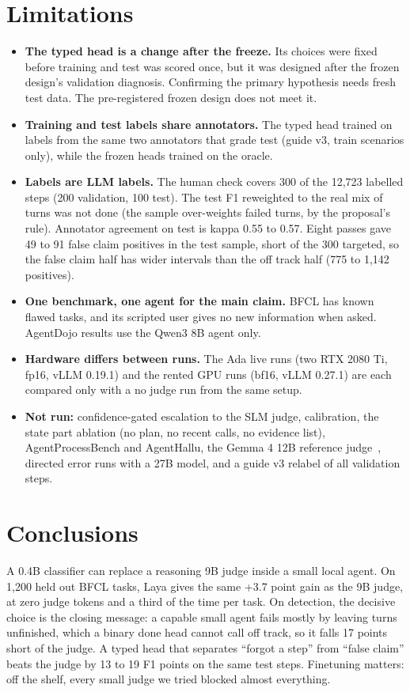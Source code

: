 \documentclass[10pt,a4paper]{article}
\begin{document}
\section{Limitations}\label{sec:limits}
\begin{itemize}
  \item \textbf{The typed head is a change after the freeze.} Its choices were fixed before training and test was scored once, but it was designed after the frozen design's validation diagnosis. Confirming the primary hypothesis needs fresh test data. The pre-registered frozen design does not meet it.
  \item \textbf{Training and test labels share annotators.} The typed head trained on labels from the same two annotators that grade test (guide v3, train scenarios only), while the frozen heads trained on the oracle.
  \item \textbf{Labels are LLM labels.} The human check covers 300 of the 12,723 labelled steps (200 validation, 100 test). The test F1 reweighted to the real mix of turns was not done (the sample over-weights failed turns, by the proposal's rule). Annotator agreement on test is kappa 0.55 to 0.57. Eight passes gave 49 to 91 false claim positives in the test sample, short of the 300 targeted, so the false claim half has wider intervals than the off track half (775 to 1,142 positives).
  \item \textbf{One benchmark, one agent for the main claim.} BFCL has known flawed tasks, and its scripted user gives no new information when asked. AgentDojo results use the Qwen3 8B agent only.
  \item \textbf{Hardware differs between runs.} The Ada live runs (two RTX 2080 Ti, fp16, vLLM 0.19.1) and the rented GPU runs (bf16, vLLM 0.27.1) are each compared only with a no judge run from the same setup.
  \item \textbf{Not run:} confidence-gated escalation to the SLM judge, calibration, the state part ablation (no plan, no recent calls, no evidence list), AgentProcessBench and AgentHallu, the Gemma 4 12B reference judge~\cite{gemma}, directed error runs with a 27B model, and a guide v3 relabel of all validation steps.
\end{itemize}

\section{Conclusions}\label{sec:conclusion}
A 0.4B classifier can replace a reasoning 9B judge inside a small local agent. On 1,200 held out BFCL tasks, Laya gives the same +3.7 point gain as the 9B judge, at zero judge tokens and a third of the time per task. On detection, the decisive choice is the closing message: a capable small agent fails mostly by leaving turns unfinished, which a binary done head cannot call off track, so it falls 17 points short of the judge. A typed head that separates ``forgot a step'' from ``false claim'' beats the judge by 13 to 19 F1 points on the same test steps. Finetuning matters: off the shelf, every small judge we tried blocked almost everything.
\end{document}

